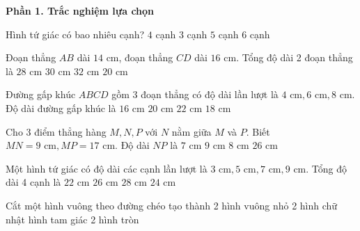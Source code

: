 \textbf{Phần 1. Trắc nghiệm lựa chọn}

\begin{ex} %
Hình tứ giác có bao nhiêu cạnh?
\choice
{\True $4$ cạnh}
{$3$ cạnh}
{$5$ cạnh}
{$6$ cạnh}
\end{ex}

\begin{ex} %
Đoạn thẳng $AB$ dài $14\text{ cm}$, đoạn thẳng $CD$ dài $16\text{ cm}$. Tổng độ dài 2 đoạn thẳng là
\choice
{$28\text{ cm}$}
{\True $30\text{ cm}$}
{$32\text{ cm}$}
{$20\text{ cm}$}
\end{ex}

\begin{ex} %
Đường gấp khúc $ABCD$ gồm 3 đoạn thẳng có độ dài lần lượt là $4\text{ cm}, 6\text{ cm}, 8\text{ cm}$. Độ dài đường gấp khúc là
\choice
{$16\text{ cm}$}
{$20\text{ cm}$}
{$22\text{ cm}$}
{\True $18\text{ cm}$}
\end{ex}

\begin{ex} %
Cho 3 điểm thẳng hàng $M, N, P$ với $N$ nằm giữa $M$ và $P$. Biết $MN = 9\text{ cm}, MP = 17\text{ cm}$. Độ dài $NP$ là
\choice
{$7\text{ cm}$}
{$9\text{ cm}$}
{\True $8\text{ cm}$}
{$26\text{ cm}$}
\end{ex}

\begin{ex} %
Một hình tứ giác có độ dài các cạnh lần lượt là $3\text{ cm}, 5\text{ cm}, 7\text{ cm}, 9\text{ cm}$. Tổng độ dài 4 cạnh là
\choice
{$22\text{ cm}$}
{$26\text{ cm}$}
{$28\text{ cm}$}
{\True $24\text{ cm}$}
\end{ex}

\begin{ex} %
Cắt một hình vuông theo đường chéo tạo thành
\choice
{2 hình vuông nhỏ}
{2 hình chữ nhật}
{ hình tam giác}
{2 hình tròn}
\end{ex}

